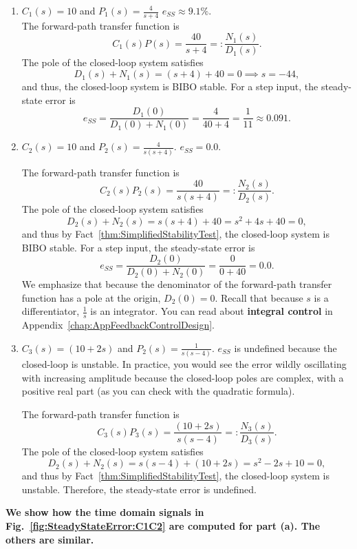  \begin{enumerate}
\renewcommand{\labelenumi}{(\alph{enumi})}
\setlength{\itemsep}{.2cm}
\item $C_1(s) = 10$ and $P_1(s) = \frac{4}{s+4}$ \quad \Ans \quad $e_{SS} \approx 9.1\%$.\\

The forward-path transfer function is
$$C_1(s)P(s)=\frac{40}{s+4}=:\frac{N_1(s)}{D_1(s)}.  $$
The pole of the closed-loop system satisfies
$$D_1(s) + N_1(s) = (s+4) + 40 =0\implies  s=-44,$$
and thus, the closed-loop system is BIBO stable. For a step input, the steady-state error is
$$e_{SS} = \frac{D_1(0)}{D_1(0)+ N_1(0)} = \frac{4}{40 + 4} = \frac{1}{11} \approx 0.091.$$


\item $C_2(s)= 10$ and $P_2(s) = \frac{4}{s(s+4)}$.  \quad \Ans \quad $e_{SS} =0.0$.

The forward-path transfer function is
$$C_2(s)P_2(s)=\frac{40}{s(s+4)}=:\frac{N_2(s)}{D_2(s)}.  $$
The pole of the closed-loop system satisfies
$$D_2(s) + N_2(s)  = s(s+4) + 40 = s^2 + 4s + 40=0,$$
and thus by Fact~\ref{thm:SimplifiedStabilityTest}, the closed-loop system is BIBO stable. For a step input, the steady-state error is
$$e_{SS} = \frac{D_2(0)}{D_2(0)+ N_2(0)} = \frac{0}{0 + 40} = 0.0.$$
We emphasize that because the denominator of the forward-path transfer function has a pole at the origin, $D_2(0) = 0$. Recall that because $s$ is a differentiator, $\frac{1}{s}$ is an integrator. You can read about \textbf{integral control} in Appendix~\ref{chap:AppFeedbackControlDesign}.

\item $C_3(s)= (10 + 2s)$ and $P_2(s) = \frac{1}{s(s-4)}$. \quad \Ans \quad $e_{SS}$ is undefined because the closed-loop is unstable. In practice, you would see the error wildly oscillating with increasing amplitude because the closed-loop poles are complex, with a positive real part (as you can check with the quadratic formula). 

The forward-path transfer function is
$$C_3(s)P_3(s)=\frac{(10+2s)}{s(s-4)}=:\frac{N_3(s)}{D_3(s)}.  $$
The pole of the closed-loop system satisfies
$$D_2(s) + N_2(s)  = s(s-4) + (10+2s) = s^2 -2 s + 10=0,$$
and thus by Fact~\ref{thm:SimplifiedStabilityTest}, the closed-loop system is unstable. Therefore, the steady-state error is undefined.
\end{enumerate}

\textbf{We show how the time domain signals in Fig.~\ref{fig:SteadyStateError:C1C2} are computed for part (a). The others are similar.}

